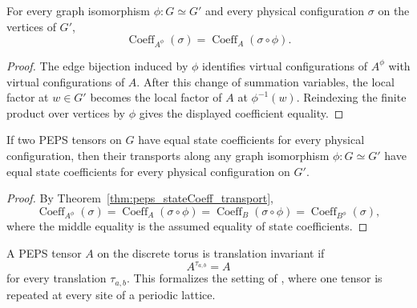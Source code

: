 \begin{theorem}%
    \label{thm:peps_stateCoeff_transport}
    \leanok
    For every graph isomorphism $\phi:G\simeq G'$ and every physical
    configuration $\sigma$ on the vertices of $G'$,
    \[
        \operatorname{Coeff}_{A^\phi}(\sigma)
        =
        \operatorname{Coeff}_{A}(\sigma\circ\phi).
    \]
\end{theorem}
\begin{proof}\leanok
    The edge bijection induced by $\phi$ identifies virtual configurations
    of $A^\phi$ with virtual configurations of $A$. After this change of
    summation variables, the local factor at $w\in G'$ becomes the local
    factor of $A$ at $\phi^{-1}(w)$. Reindexing the finite product over
    vertices by $\phi$ gives the displayed coefficient equality.
\end{proof}

\begin{theorem}%
    \label{thm:peps_sameState_transport}
    \leanok
    If two PEPS tensors on $G$ have equal state coefficients for every
    physical configuration, then their transports along any graph
    isomorphism $\phi:G\simeq G'$ have equal state coefficients for every
    physical configuration on $G'$.
\end{theorem}
\begin{proof}\leanok
    By Theorem~\ref{thm:peps_stateCoeff_transport},
    \[
        \operatorname{Coeff}_{A^\phi}(\sigma)
        =
        \operatorname{Coeff}_{A}(\sigma\circ\phi)
        =
        \operatorname{Coeff}_{B}(\sigma\circ\phi)
        =
        \operatorname{Coeff}_{B^\phi}(\sigma),
    \]
    where the middle equality is the assumed equality of state coefficients.
\end{proof}

\begin{definition}%
    \label{def:peps_torus_translation_invariant}
    \leanok
    A PEPS tensor $A$ on the discrete torus is translation invariant if
    \[
        A^{\tau_{a,b}} = A
    \]
    for every translation $\tau_{a,b}$. This formalizes the setting of
    \cite[Theorem~3]{Molnar2018NormalPEPS}, where one tensor is repeated at
    every site of a periodic lattice.
\end{definition}

